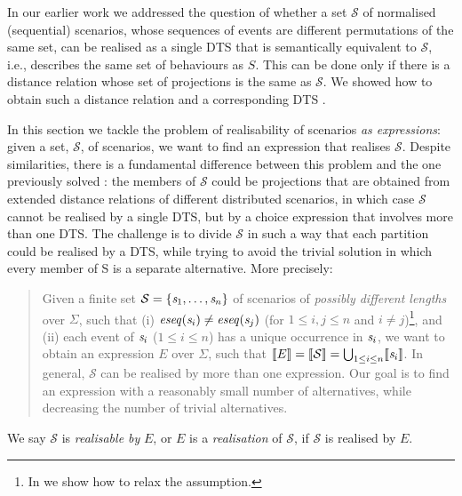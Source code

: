 In our earlier work \cite{DTS-2025} we addressed the question of whether
a set $\mathcal{S}$ of normalised (sequential) scenarios, whose
sequences of events are different permutations of the same set, can be
realised as a single DTS that is
semantically equivalent to $\mathcal{S}$, i.e., describes the same set of
behaviours as $S$. This can be done only if there is a distance
relation whose set of projections is the same as $\mathcal{S}$. We
showed how to obtain such a distance relation and a corresponding
DTS \cite{DTS-2025}.

In this section we tackle the problem of realisability of
scenarios \emph{as expressions}: given a set, $\mathcal{S}$,
of scenarios, we want to find an expression that realises
$\mathcal{S}$.
Despite similarities, there is a fundamental difference between
this problem and the one previously solved \cite{DTS-2025}: the
members of $\mathcal{S}$ could be projections that are obtained from
extended distance relations of different distributed
scenarios, in which case $\mathcal{S}$ cannot be realised by a single
DTS, but by a choice expression that involves more than one DTS. The
challenge is to divide $\mathcal{S}$ in such a way that each
partition could be realised by a DTS, while trying to avoid the trivial
solution in which every member of S is a separate alternative.
More precisely:
\vspace{-0.5em}
\begin{quote}
Given a finite set $\mathcal{S}=\{\mathit{s}_1,\dots,\mathit{s}_n\}$ of
scenarios of \emph{possibly different lengths} over
$\Sigma$, such that
(i) $\mathit{eseq}(\mathit{s}_i)\neq \mathit{eseq}(\mathit{s}_j)$ (for $1\leq
i,j\leq n$ and $i\neq j$)\footnote{In  we
show how to relax the assumption.}, and (ii)
each event of $\mathit{s}_i$ ($1\leq i\leq n$) has a
unique occurrence in $\mathit{s}_i$,
we want to obtain an expression $E$
over $\Sigma$, such that $\llbracket E \rrbracket = \llbracket \mathcal{S} \rrbracket=\bigcup_{1\leq
i \leq n} \llbracket \mathit{s}_i \rrbracket$.
In general, $\mathcal{S}$ can be realised by more than one
expression.
Our goal is to find an expression with a
reasonably small number of alternatives, while decreasing the number
of trivial alternatives.
\end{quote}
\vspace{-0.6em}
We say $\mathcal{S}$ is \emph{realisable by} $E$, or
$E$ is a \emph{realisation} of $\mathcal{S}$, if $\mathcal{S}$ is
realised by $E$.
\vspace{-0.2em}
